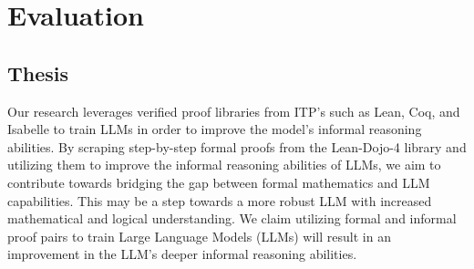\section{Evaluation}

\subsection{Thesis}

Our research leverages verified proof libraries from ITP's such as Lean, Coq, and Isabelle to train LLMs in order to improve the model's informal reasoning abilities. By scraping step-by-step formal proofs from the Lean-Dojo-4 library and utilizing them to improve the informal reasoning abilities of LLMs, we aim to contribute towards bridging the gap between formal mathematics and LLM capabilities. This may be a step towards a more robust LLM with increased mathematical and logical understanding. We claim utilizing formal and informal proof pairs to train Large Language Models (LLMs) will result in an improvement in the LLM's deeper informal reasoning abilities.
